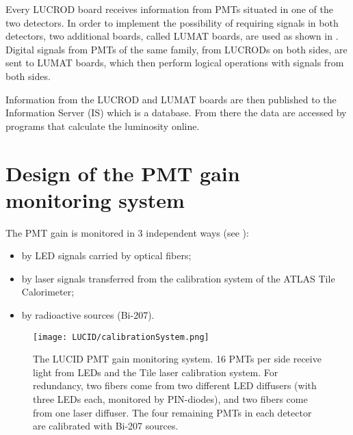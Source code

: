Every LUCROD board receives information from PMTs situated in one of the two detectors.
In order to implement the possibility of requiring signals in both detectors, two additional boards, called LUMAT boards, are used
as shown in .
Digital signals from PMTs of the same family, from LUCRODs on both sides, are sent to LUMAT boards, 
which then perform logical operations with signals from both sides.

Information from the LUCROD and LUMAT boards are then published to the Information Server (IS) which is a database.
From there the data are accessed by programs that calculate the luminosity online.

\section{Design of the PMT gain monitoring system}
\label{sec:pmtGainMonitoringSystem}

The PMT gain is monitored in 3 independent ways (see ):
\begin{itemize}
 \item by LED signals carried by optical fibers;
 \item by laser signals transferred from the calibration system of the ATLAS Tile Calorimeter;
 \item by radioactive sources (Bi-207).
\end{itemize}

\begin{figure}
\centering
\texttt{[image: LUCID/calibrationSystem.png]}
\caption{The LUCID PMT gain monitoring system. 16 PMTs per side receive light from LEDs and the Tile laser calibration 
system. 
For redundancy, two fibers come from two different LED diffusers (with three LEDs each, monitored by 
PIN-diodes), and two fibers come from one laser diffuser. The four remaining PMTs in each detector are calibrated 
with Bi-207 sources.}
\label{fig:calibrationSystem}
\end{figure}


